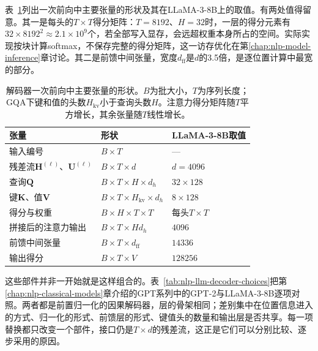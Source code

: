 表~\ref{tab:nlp-llm-decoder-shapes}列出一次前向中主要张量的形状及其在LLaMA-3-8B上的取值。有两处值得留意。其一是每头的$T\times T$得分矩阵：$T=8192$、$H=32$时，一层的得分元素有$32\times8192^2\approx2.1\times10^{9}$个，若全部写入显存，会远超权重本身所占的空间。实际实现按块计算softmax，不保存完整的得分矩阵，这一访存优化在第\ref{chap:nlp-model-inference}章讨论。其二是前馈中间张量，宽度$d_{\mathrm{ff}}$是$d$的3.5倍，是逐位置计算中最宽的部分。

\begin{table}[htbp]
  \centering
  \begin{tabular}{@{}lll@{}}
    \toprule
    张量 & 形状 & LLaMA-3-8B取值\\
    \midrule
    输入编号 & $B\times T$ & ---\\
    残差流$\bm H^{(\ell)}$、$\bm U^{(\ell)}$ & $B\times T\times d$ & $d=4096$\\
    查询$\bm Q$ & $B\times T\times H\times d_h$ & $32\times128$\\
    键$\bm K$、值$\bm V$ & $B\times T\times H_{\mathrm{kv}}\times d_h$ & $8\times128$\\
    得分与权重 & $B\times H\times T\times T$ & 每头$T\times T$\\
    拼接后的注意力输出 & $B\times T\times Hd_h$ & $4096$\\
    前馈中间张量 & $B\times T\times d_{\mathrm{ff}}$ & $14336$\\
    输出得分 & $B\times T\times V$ & $128256$\\
    \bottomrule
  \end{tabular}
  \caption{解码器一次前向中主要张量的形状。$B$为批大小，$T$为序列长度；GQA下键和值的头数$H_{\mathrm{kv}}$小于查询头数$H$。注意力得分矩阵随$T$平方增长，其余张量随$T$线性增长。}
  \label{tab:nlp-llm-decoder-shapes}
\end{table}

这些部件并非一开始就是这样组合的。表~\ref{tab:nlp-llm-decoder-choices}把第\ref{chap:nlp-classical-models}章介绍的GPT系列中的GPT-2与LLaMA-3-8B逐项对照。两者都是前置归一化的因果解码器，层的骨架相同；差别集中在位置信息进入的方式、归一化的形式、前馈层的形式、键值头的数量和输出层是否共享。每一项替换都只改变一个部件，接口仍是$T\times d$的残差流，这正是它们可以分别比较、逐步采用的原因。

